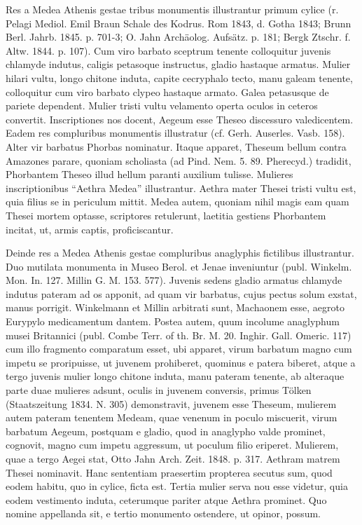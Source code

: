 \documentclass[a4paper, 11pt, oneside, polutonikogreek, german]{article}
\begin{document}
Res a Medea Athenis gestae tribus monumentis illustrantur primum cylice (r. Pelagi Mediol. Emil Braun Schale des Kodrus. Rom 1843, d. Gotha 1843; Brunn Berl. Jahrb. 1845. p. 701-3; O. Jahn Archäolog. Aufsätz. p. 181; Bergk Ztschr. f. Altw. 1844. p. 107). Cum viro barbato sceptrum tenente colloquitur juvenis chlamyde indutus, caligis petasoque instructus, gladio hastaque armatus. Mulier hilari vultu, longo chitone induta, capite cecryphalo tecto, manu galeam tenente, colloquitur cum viro barbato clypeo hastaque armato. Galea petasusque de pariete dependent. Mulier tristi vultu velamento operta oculos in ceteros convertit. Inscriptiones nos docent, Aegeum esse Theseo discessuro valedicentem. Eadem res compluribus monumentis illustratur (cf. Gerh. Auserles. Vasb. 158). Alter vir barbatus Phorbas nominatur. Itaque apparet, Theseum bellum contra Amazones parare, quoniam scholiasta (ad Pind. Nem. 5. 89. Pherecyd.) tradidit, Phorbantem Theseo illud hellum paranti auxilium tulisse. Mulieres inscriptionibus "`Aethra Medea"' illustrantur. Aethra mater Thesei tristi vultu est, quia filius se in periculum mittit. Medea autem, quoniam nihil magis eam quam Thesei mortem optasse, scriptores retulerunt, laetitia gestiens Phorbantem incitat, ut, armis captis, proficiscantur.

Deinde res a Medea Athenis gestae compluribus anaglyphis fictilibus illustrantur. Duo mutilata monumenta in Museo Berol. et Jenae inveniuntur (publ. Winkelm. Mon. In. 127. Millin G. M. 153. 577). Juvenis sedens gladio armatus chlamyde indutus pateram ad os apponit, ad quam vir barbatus, cujus pectus solum exstat, manus porrigit. Winkelmann et Millin arbitrati sunt, Machaonem esse, aegroto Eurypylo medicamentum dantem. Postea autem, quum incolume anaglyphum musei Britannici (publ. Combe Terr. of th. Br. M. 20. Inghir. Gall. Omeric. 117) cum illo fragmento comparatum esset, ubi apparet, virum barbatum magno cum impetu se proripuisse, ut juvenem prohiberet, quominus e patera biberet, atque a tergo juvenis mulier longo chitone induta, manu pateram tenente, ab alteraque parte duae mulieres adsunt, oculis in juvenem conversis, primus Tölken (Staatszeitung 1834. N. 305) demonstravit, juvenem esse Theseum, mulierem autem pateram tenentem Medeam, quae venenum in poculo miscuerit, virum barbatum Aegeum, postquam e gladio, quod in anaglypho valde prominet, cognovit, magno cum impetu aggressum, ut poculum filio eriperet. Mulierem, quae a tergo Aegei stat, Otto Jahn Arch. Zeit. 1848. p. 317. Aethram matrem Thesei nominavit. Hanc sententiam praesertim propterea secutus sum, quod eodem habitu, quo in cylice, ficta est. Tertia mulier serva nou esse videtur, quia eodem vestimento induta, ceterumque pariter atque Aethra prominet. Quo nomine appellanda sit, e tertio monumento ostendere, ut opinor, possum.
\end{document}

